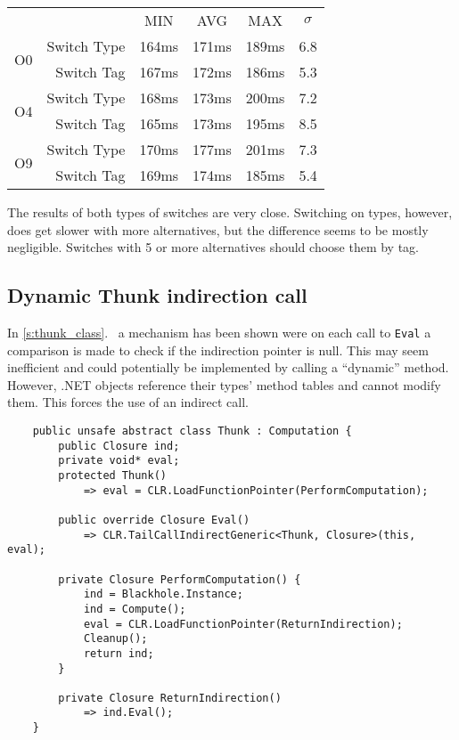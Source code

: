 \documentclass[en]{pracamgr}
\newcommand{\myref}[1]{\ref{#1}.~\nameref{#1}}
\begin{document}
\begin{center}
\begin{tabular}{c r c c c c}
    & & MIN & AVG & MAX & $\sigma$ \\
    \cline{3-6}
        
    \multirow{2}{*}{O0} & Switch Type & 164ms & 171ms & 189ms & 6.8 \\
    & Switch Tag & 167ms & 172ms & 186ms & 5.3 \\
    \cline{2-6}

    \multirow{2}{*}{O4} & Switch Type & 168ms & 173ms & 200ms & 7.2 \\
    & Switch Tag & 165ms & 173ms & 195ms & 8.5 \\
    \cline{2-6}

    \multirow{2}{*}{O9} & Switch Type & 170ms & 177ms & 201ms & 7.3 \\
    & Switch Tag & 169ms & 174ms & 185ms & 5.4 \\
\end{tabular}
\end{center}

The results of both types of switches are very close.
Switching on types, however, does get slower with more alternatives,
but the difference seems to be mostly negligible.
Switches with 5 or more alternatives should choose them by tag.

\subsection{Dynamic Thunk indirection call}\label{perf:thunk_ind}

In \myref{s:thunk_class} a mechanism has been shown were
on each call to \texttt{Eval} a comparison is made to
check if the indirection pointer is null.
This may seem inefficient and could potentially be implemented
by calling a ``dynamic'' method.
However, .NET objects reference their types' method tables
and cannot modify them. This forces the use of an indirect call.

\begin{verbatim}
    public unsafe abstract class Thunk : Computation {
        public Closure ind;
        private void* eval;
        protected Thunk()
            => eval = CLR.LoadFunctionPointer(PerformComputation);
        
        public override Closure Eval()
            => CLR.TailCallIndirectGeneric<Thunk, Closure>(this, eval);
        
        private Closure PerformComputation() {
            ind = Blackhole.Instance;
            ind = Compute();
            eval = CLR.LoadFunctionPointer(ReturnIndirection);
            Cleanup();
            return ind;
        }

        private Closure ReturnIndirection()
            => ind.Eval();
    }
\end{verbatim}
\end{document}
